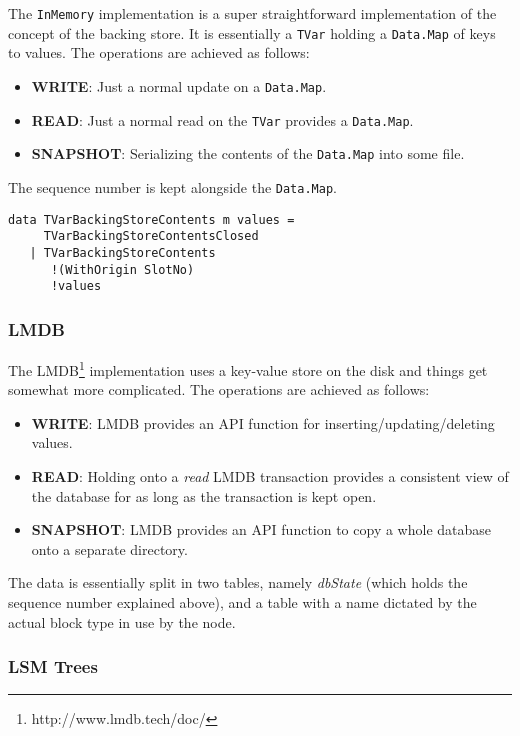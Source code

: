\documentclass[11pt,a4paper]{article}
\theoremstyle{definition}
\begin{document}
The \texttt{InMemory} implementation is a super straightforward implementation
of the concept of the backing store. It is essentially a \texttt{TVar} holding a
\texttt{Data.Map} of keys to values. The operations are achieved as follows:

\begin{itemize}
  \item \textbf{WRITE}: Just a normal update on a \texttt{Data.Map}.
  \item \textbf{READ}: Just a normal read on the \texttt{TVar} provides a \texttt{Data.Map}.
  \item \textbf{SNAPSHOT}: Serializing the contents of the \texttt{Data.Map} into some file.
\end{itemize}

The sequence number is kept alongside the \texttt{Data.Map}.

\begin{lstlisting}
data TVarBackingStoreContents m values =
     TVarBackingStoreContentsClosed
   | TVarBackingStoreContents
      !(WithOrigin SlotNo)
      !values
\end{lstlisting}

\subsubsection{LMDB}

The LMDB\footnote{http://www.lmdb.tech/doc/} implementation uses a key-value store on the disk and things get somewhat more complicated. The operations are achieved as follows:

\begin{itemize}
  \item \textbf{WRITE}: LMDB provides an API function for inserting/updating/deleting values.
  \item \textbf{READ}: Holding onto a \emph{read} LMDB transaction provides a
        consistent view of the database for as long as the transaction is kept
        open.
  \item \textbf{SNAPSHOT}: LMDB provides an API function to copy a whole
        database onto a separate directory.
\end{itemize}

The data is essentially split in two tables, namely \emph{dbState} (which
holds the sequence number explained above), and a table with a name
dictated by the actual block type in use by the node.

\subsubsection{LSM Trees}
\end{document}
